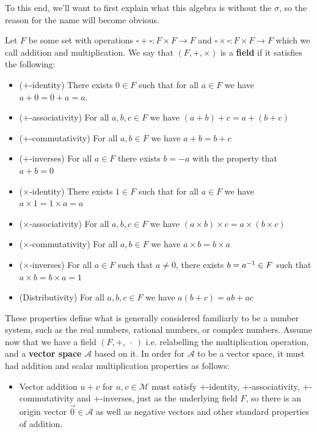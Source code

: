 \documentclass[11pt]{article}
\begin{document}
To this end, we'll want to first explain what this algebra is without the $\sigma$, so the reason for the name will become obvious.

\begin{definition}
Let $F$ be some set with operations $\square + \square \colon F \times F \to F$ and $\square \times \square \colon F \times F \to F$ which we call addition and multiplication. We say that $(F,+,\times)$ is a \textbf{field} if it satisfies the following: \begin{itemize}
\item ($+$-identity) There exists $0 \in F$ such that for all $a \in F$ we have $a + 0 = 0 + a = a$.
\item ($+$-associativity) For all $a,b,c \in F$ we have $(a + b) + c = a + (b + c)$
\item ($+$-commutativity) For all $a,b \in F$ we have $a + b = b + c$
\item ($+$-inverses) For all $a \in F$ there exists $b = -a$ with the property that $a + b = 0$
\item ($\times$-identity) There exists $1 \in F$ such that for all $a \in F$ we have $a \times 1 = 1 \times a = a$
\item ($\times$-associativity) For all $a,b,c \in F$ we have $(a \times b) \times c = a \times (b \times c)$
\item ($\times$-commutativity) For all $a,b \in F$ we have $a\times b = b \times a$
\item ($\times$-inverses) For all $a \in F$ such that $a \neq 0$, there exists $b = a^{-1} \in F$ such that $a \times b = b \times a = 1$
\item (Distributivity) For all $a,b,c \in F$ we have $a(b + c) = ab + ac$
\end{itemize}
These properties define what is generally considered familiarly to be a number system, such as the real numbers, rational numbers, or complex numbers. Assume now that we have a field $(F,+, \ \cdot\ )$ i.e. relabelling the multiplication operation, and a \textbf{vector space} $\mathcal A$ based on it. In order for $\mathcal A$ to be a vector space, it must had addition and scalar multiplication properties as follows: \begin{itemize}
\item Vector addition $u + v$ for $u,v \in \mathcal M$ must satisfy $+$-identity, $+$-associativity, $+$-commutativity and $+$-inverses, just as the underlying field $F$, so there is an origin vector $\vec 0 \in \mathcal A$ as well as negative vectors and other standard properties of addition.

\end{itemize}
\end{definition}
\end{document}
